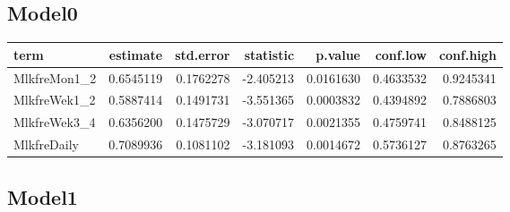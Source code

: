 \documentclass[
]{article}
\newenvironment{Shaded}{\begin{snugshade}}{\end{snugshade}}
\newcommand{\DataTypeTok}[1]{\textcolor[rgb]{0.13,0.29,0.53}{#1}}
\newcommand{\KeywordTok}[1]{\textcolor[rgb]{0.13,0.29,0.53}{\textbf{#1}}}
\newcommand{\NormalTok}[1]{#1}
\newcommand{\OperatorTok}[1]{\textcolor[rgb]{0.81,0.36,0.00}{\textbf{#1}}}
\newcommand{\OtherTok}[1]{\textcolor[rgb]{0.56,0.35,0.01}{#1}}
\newcommand{\StringTok}[1]{\textcolor[rgb]{0.31,0.60,0.02}{#1}}
\begin{document}
\hypertarget{model0-5}{%
\subsection{Model0}\label{model0-5}}

\begin{Shaded}
\end{Shaded}

\begin{longtable}[]{@{}lrrrrrr@{}}
\toprule
term & estimate & std.error & statistic & p.value & conf.low &
conf.high\tabularnewline
\midrule
\endhead
MlkfreMon1\_2 & 0.6545119 & 0.1762278 & -2.405213 & 0.0161630 &
0.4633532 & 0.9245341\tabularnewline
MlkfreWek1\_2 & 0.5887414 & 0.1491731 & -3.551365 & 0.0003832 &
0.4394892 & 0.7886803\tabularnewline
MlkfreWek3\_4 & 0.6356200 & 0.1475729 & -3.070717 & 0.0021355 &
0.4759741 & 0.8488125\tabularnewline
MlkfreDaily & 0.7089936 & 0.1081102 & -3.181093 & 0.0014672 & 0.5736127
& 0.8763265\tabularnewline
\bottomrule
\end{longtable}

\hypertarget{model1-5}{%
\subsection{Model1}\label{model1-5}}

\begin{Shaded}
\end{Shaded}
\end{document}
